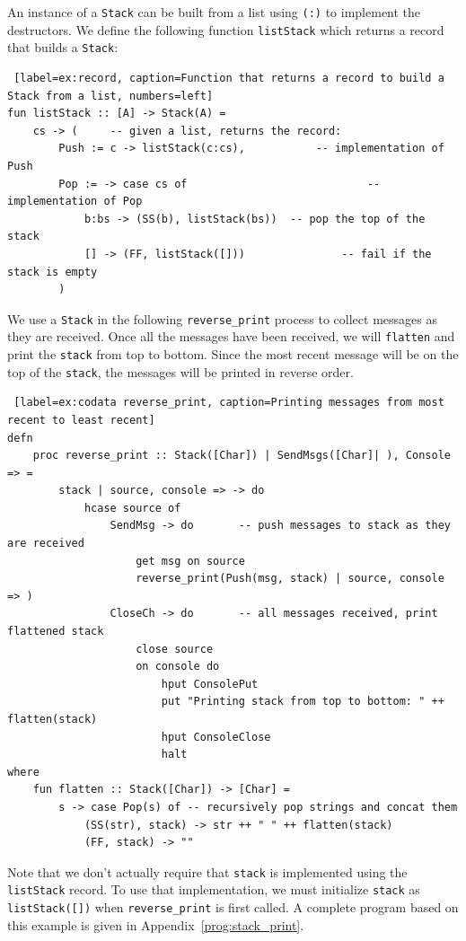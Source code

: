 \documentclass[acmsmall]{acmart}
\begin{document}
An instance of a \lstinline{Stack} can be built from a list using \lstinline{(:)} to implement the destructors.
We define the following function \lstinline$listStack$ which returns a record that builds a \lstinline{Stack}:
\begin{lstlisting} [label=ex:record, caption=Function that returns a record to build a Stack from a list, numbers=left]
fun listStack :: [A] -> Stack(A) = 
	cs -> (		-- given a list, returns the record:
		Push := c -> listStack(c:cs),			-- implementation of Push
		Pop := -> case cs of							-- implementation of Pop
			b:bs -> (SS(b), listStack(bs))	-- pop the top of the stack
			[] -> (FF, listStack([]))				-- fail if the stack is empty
		)
\end{lstlisting} 

We use a \lstinline{Stack} in the following \lstinline$reverse_print$ process to collect messages as they are received.
Once all the messages have been received, we will \lstinline$flatten$ and print the \lstinline$stack$ from top to bottom.
Since the most recent message will be on the top of the \lstinline$stack$, the messages will be printed in reverse order.
\begin{lstlisting} [label=ex:codata reverse_print, caption=Printing messages from most recent to least recent]
defn        
	proc reverse_print :: Stack([Char]) | SendMsgs([Char]| ), Console => =
		stack | source, console => -> do
			hcase source of
				SendMsg -> do		-- push messages to stack as they are received
					get msg on source
					reverse_print(Push(msg, stack) | source, console => )
				CloseCh -> do		-- all messages received, print flattened stack
					close source
					on console do
						hput ConsolePut
						put "Printing stack from top to bottom: " ++ flatten(stack)
						hput ConsoleClose
						halt
where
	fun flatten :: Stack([Char]) -> [Char] =
		s -> case Pop(s) of	-- recursively pop strings and concat them
			(SS(str), stack) -> str ++ " " ++ flatten(stack)
			(FF, stack) -> ""
\end{lstlisting}
Note that we don't actually require that \lstinline$stack$ is implemented using the \lstinline$listStack$ record.
To use that implementation, we must initialize \lstinline$stack$ as \lstinline{listStack([])} when \lstinline$reverse_print$ is first called.
A complete program based on this example is given in Appendix~\ref{prog:stack_print}.
\end{document}
